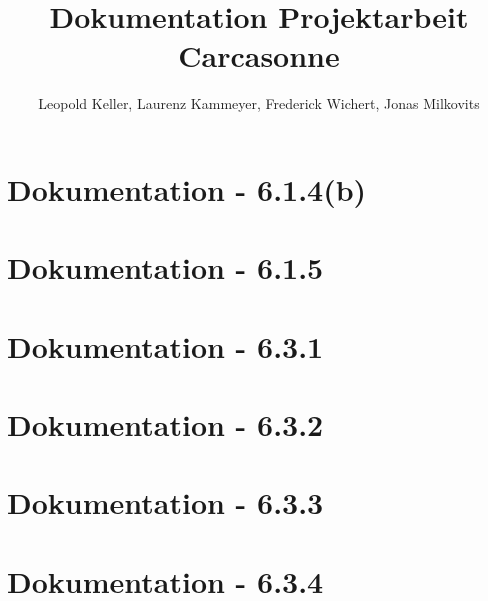 


\begin{titlepage}
  \title{Dokumentation Projektarbeit Carcasonne} %
  \author{Leopold Keller, Laurenz Kammeyer, Frederick Wichert, Jonas Milkovits}
  \date{}
\end{titlepage}



\maketitle
{} %
\tableofcontents
\clearpage
{} %


\section{Dokumentation - 6.1.4(b)}

\section{Dokumentation - 6.1.5}

\section{Dokumentation - 6.3.1}

\section{Dokumentation - 6.3.2}

\section{Dokumentation - 6.3.3}

\section{Dokumentation - 6.3.4}



